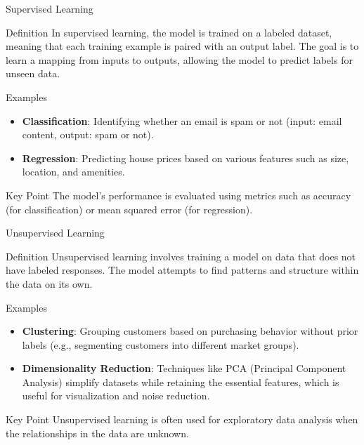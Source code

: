 \documentclass[aspectratio=169]{beamer}
\begin{document}
\begin{frame}{Supervised Learning}
    \begin{block}{Definition}
        In supervised learning, the model is trained on a labeled dataset, meaning that each training example is paired with an output label. The goal is to learn a mapping from inputs to outputs, allowing the model to predict labels for unseen data.
    \end{block}
    
    \begin{block}{Examples}
        \begin{itemize}
            \item \textbf{Classification}: Identifying whether an email is spam or not (input: email content, output: spam or not).
            \item \textbf{Regression}: Predicting house prices based on various features such as size, location, and amenities.
        \end{itemize}
    \end{block}

    \begin{block}{Key Point}
        The model's performance is evaluated using metrics such as accuracy (for classification) or mean squared error (for regression).
    \end{block}
\end{frame}

\begin{frame}{Unsupervised Learning}
    \begin{block}{Definition}
        Unsupervised learning involves training a model on data that does not have labeled responses. The model attempts to find patterns and structure within the data on its own.
    \end{block}

    \begin{block}{Examples}
        \begin{itemize}
            \item \textbf{Clustering}: Grouping customers based on purchasing behavior without prior labels (e.g., segmenting customers into different market groups).
            \item \textbf{Dimensionality Reduction}: Techniques like PCA (Principal Component Analysis) simplify datasets while retaining the essential features, which is useful for visualization and noise reduction.
        \end{itemize}
    \end{block}

    \begin{block}{Key Point}
        Unsupervised learning is often used for exploratory data analysis when the relationships in the data are unknown.
    \end{block}
\end{frame}
\end{document}
